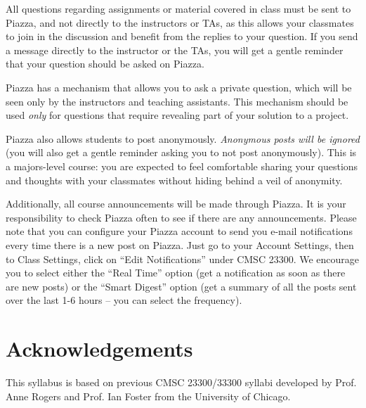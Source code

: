 \documentclass[11pt]{article}
\begin{document}
All questions regarding assignments or material covered in class must be sent to Piazza, and not directly to the instructors or TAs, as this allows your classmates to join in the discussion and benefit from the replies to your question. If you send a message directly to the instructor or the TAs, you will get a gentle reminder that your question should be asked on Piazza. 

Piazza has a mechanism that allows you to ask a private question, which will be seen only by the instructors and teaching assistants. This mechanism should be used \emph{only} for questions that require revealing part of your solution to a project.

Piazza also allows students to post anonymously. \emph{Anonymous posts will be ignored} (you will also get a gentle reminder asking you to not post anonymously). This is a majors-level course: you are expected to feel comfortable sharing your questions and thoughts with your classmates without hiding behind a veil of anonymity.

Additionally, all course announcements will be made through Piazza.
It is your responsibility to check Piazza often to see if there are
any announcements. Please note that you can configure your Piazza account
to send you e-mail notifications every time there is a new post on
Piazza. Just go to your Account Settings, then to Class Settings, 
click on ``Edit Notifications'' under CMSC 23300. We 
encourage you to select either the ``Real Time'' option (get a notification
as soon as there are new posts) or the ``Smart Digest'' option (get
a summary of all the posts sent over the last 1-6 hours -- you can select
the frequency).


\section{Acknowledgements}

This syllabus is based on previous CMSC 23300/33300 syllabi developed by Prof. Anne Rogers and Prof. Ian Foster from the University of Chicago.
\end{document}
